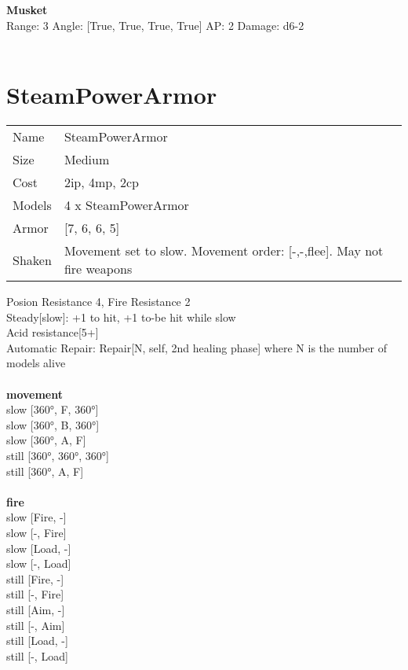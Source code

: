 \ \\

\ \\
{\bf Musket } \\



Range: 3  Angle: [True, True, True, True] AP: 2 Damage: d6-2 \\




 
\ \\













\clearpage

\section{ SteamPowerArmor }

\begin{tabular}{ll}
  Name & SteamPowerArmor \\
  Size & Medium\\
  Cost & 2ip, 4mp, 2cp\\
  Models & 4 x SteamPowerArmor\\
  Armor & [7, 6, 6, 5]\\
  Shaken & Movement set to slow. Movement order: [-,-,flee]. May not fire weapons\\
\end{tabular}

\noindent Posion Resistance 4, Fire Resistance 2\\ 
Steady[slow]: +1 to hit, +1 to-be hit while slow\\ 
Acid resistance[5+]\\ 
Automatic Repair: Repair[N, self, 2nd healing phase] where N is the number of models alive\\ 


\ \\ {\bf movement } \\
slow [360°, F, 360°] \\
slow [360°, B, 360°] \\
slow [360°, A, F] \\
still [360°, 360°, 360°] \\
still [360°, A, F] \\
\ \\ {\bf fire } \\
slow [Fire, -] \\
slow [-, Fire] \\
slow [Load, -] \\
slow [-, Load] \\
still [Fire, -] \\
still [-, Fire] \\
still [Aim, -] \\
still [-, Aim] \\
still [Load, -] \\
still [-, Load] \\



